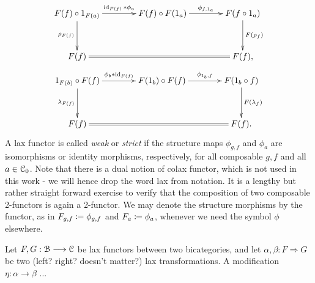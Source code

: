 \begin{defn}
\begin{gather*}
      \xymatrix@C+1.5em@R+1em{
        F(f) \circ 1_{F(a)}
          \ar[r]^-{\id_{F(f)} \ast \phi_a}
          \ar[d]_{\rho_{F(f)}}
        &
        F(f) \circ F(1_a)
          \ar[r]^-{\phi_{f,1_a}}
        &
        F(f \circ 1_a)
          \ar[d]^{F(\rho_f)}
        \\
        F(f)
          \ar@{=}[rr]
        &
        &
        F(f),
      }
    \end{gather*}
    \begin{gather*}
      \xymatrix@C+1.5em@R+1em{
        1_{F(b)} \circ F(f)
          \ar[r]^-{\phi_b \ast \id_{F(f)}}
          \ar[d]_{\lambda_{F(f)}}
        &
        F(1_b) \circ F(f)
          \ar[r]^-{\phi_{1_b,f}}
        &
        F(1_b \circ f)
          \ar[d]^{F(\lambda_f)}
        \\
        F(f)
          \ar@{=}[rr]
        &
        &
        F(f).
       }
    \end{gather*}
    A lax functor is called \emph{weak} or \emph{strict} if the structure maps $\phi_{g,f}$ and $\phi_a$ are isomorphisms or identity morphisms, respectively, for all composable $g,f$ and all $a \in \mathcal{C}_0$. 
    Note that there is a dual notion of colax functor, which is not used in this work - we will hence drop the word lax from notation. 
    It is a lengthy but rather straight forward exercise to verify that the composition of two composable 2-functors is again a 2-functor. 
    We may denote the structure morphisms by the functor, as in $F_{g,f} \coloneqq \phi_{g,f}$ and $F_a \coloneqq \phi_a$, whenever we need the symbol $\phi$ elsewhere.
  \end{defn}

  \begin{defn}\label{def_modification}
  Let $F,G: \mathcal{B} \longrightarrow \mathcal{C}$ be lax functors between two bicategories, and let $\alpha,\beta: F \Rightarrow G$ be two (left? right? doesn't matter?) lax transformations. A modification $\eta: \alpha \to \beta$ ...
  \end{defn}

